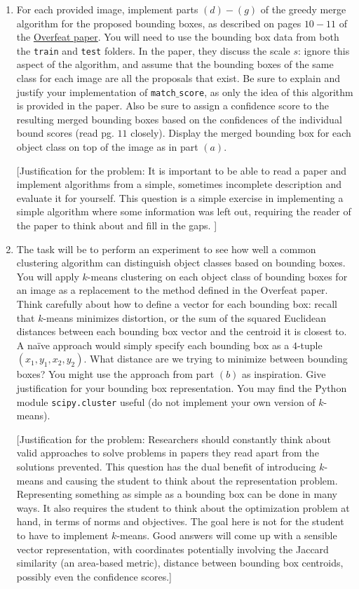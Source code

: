 \documentclass[12pt]{article}
\begin{document}
\begin{enumerate}
\item For each provided image, implement parts $(d)-(g)$ of the greedy merge algorithm for the proposed bounding boxes, as described on pages $10-11$ of the \href{http://arxiv.org/pdf/1312.6229v4.pdf}{Overfeat paper}. You will need to use the bounding box data from both the \texttt{train} and \texttt{test} folders. In the paper, they discuss the scale $s$: ignore this aspect of the algorithm, and assume that the bounding boxes of the same class for each image are all the proposals that exist. Be sure to explain and justify your implementation of \texttt{match$\_$score}, as only the idea of this algorithm is provided in the paper. Also be sure to assign a confidence score to the resulting merged bounding boxes based on the confidences of the individual bound scores (read pg. $11$ closely). Display the merged bounding box for each object class on top of the image as in part $(a)$.

[Justification for the problem: It is important to be able to read a paper and implement algorithms from a simple, sometimes incomplete description and evaluate it for yourself. This question is a simple exercise in implementing a simple algorithm where some information was left out, requiring the reader of the paper to think about and fill in the gaps. ]

\item The task will be to perform an experiment to see how well a common clustering algorithm can distinguish object classes based on bounding boxes. You will apply $k$-means clustering on each object class of bounding boxes for an image as a replacement to the method defined in the Overfeat paper. Think carefully about how to define a vector for each bounding box: recall that $k$-means minimizes distortion, or the sum of the squared Euclidean distances between each bounding box vector and the centroid it is closest to. A na{\"i}ve approach would simply specify each bounding box as a $4$-tuple $(x_1, y_1, x_2, y_2)$. What distance are we trying to minimize between bounding boxes? You might use the approach from part $(b)$ as inspiration. Give justification for your bounding box representation. You may find the Python module \texttt{scipy.cluster} useful (do not implement your own version of $k$-means).

[Justification for the problem: Researchers should constantly think about valid approaches to solve problems in papers they read apart from the solutions prevented. This question has the dual benefit of introducing $k$-means and causing the student to think about the representation problem. Representing something as simple as a bounding box can be done in many ways. It also requires the student to think about the optimization problem at hand, in terms of norms and objectives. The goal here is not for the student to have to implement $k$-means. Good answers will come up with a sensible vector representation, with coordinates potentially involving the Jaccard similarity (an area-based metric), distance between bounding box centroids, possibly even the confidence scores.]


\end{enumerate}
\end{document}

